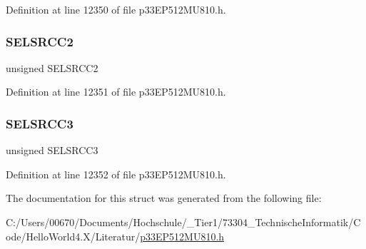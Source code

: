 Definition at line 12350 of file p33\+E\+P512\+M\+U810.\+h.

\mbox{\label{structtag_c_m1_m_s_k_s_r_c_b_i_t_s_a7cf665e6530692c6a4905ad1e53934ad}} 
\subsubsection{\texorpdfstring{S\+E\+L\+S\+R\+C\+C2}{SELSRCC2}}
{\footnotesize\ttfamily unsigned S\+E\+L\+S\+R\+C\+C2}



Definition at line 12351 of file p33\+E\+P512\+M\+U810.\+h.

\mbox{\label{structtag_c_m1_m_s_k_s_r_c_b_i_t_s_a232ce18f72b62eef1f6ac40a0c4b7f31}} 
\subsubsection{\texorpdfstring{S\+E\+L\+S\+R\+C\+C3}{SELSRCC3}}
{\footnotesize\ttfamily unsigned S\+E\+L\+S\+R\+C\+C3}



Definition at line 12352 of file p33\+E\+P512\+M\+U810.\+h.



The documentation for this struct was generated from the following file\+:\begin{DoxyCompactItemize}
\item 
C\+:/\+Users/00670/\+Documents/\+Hochschule/\+\_\+\+Tier1/73304\+\_\+\+Technische\+Informatik/\+Code/\+Hello\+World4.\+X/\+Literatur/\hyperlink{p33_e_p512_m_u810_8h}{p33\+E\+P512\+M\+U810.\+h}\end{DoxyCompactItemize}
